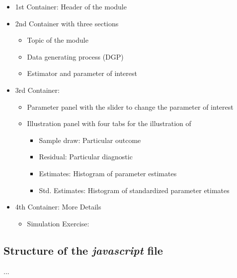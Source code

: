 \documentclass[12pt]{article}
\begin{document}
\begin{itemize}
	\item 1st Container: Header of the module
	\item 2nd Container with three sections
	\begin{itemize}
		\item Topic of the module
		\item Data generating process (DGP)
		\item Estimator and parameter of interest
	\end{itemize}
	\item 3rd Container:
	\begin{itemize}
		\item Parameter panel with the slider to change the parameter of interest
		\item Illustration panel with four tabs for the illustration of
		\begin{itemize}
			\item Sample draw: Particular outcome
			\item Residual: Particular diagnostic
			\item Estimates: Histogram of parameter estimates
			\item Std. Estimates: Histogram of standardized parameter etimates
		\end{itemize}
	\end{itemize}
	\item 4th Container: More Details
	\begin{itemize}
		\item Simulation Exercise: 
	\end{itemize}
	
\end{itemize}





\subsection{Structure of the \emph{javascript} file}\label{SecHowJs}

...

\end{document}
